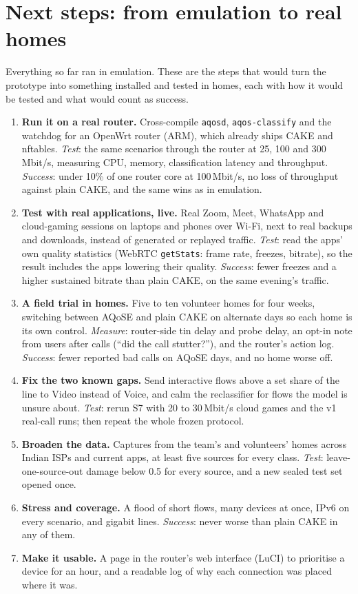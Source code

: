 \documentclass[11pt,a4paper]{article}
\begin{document}
\section{Next steps: from emulation to real homes}
Everything so far ran in emulation. These are the steps that would turn the prototype into something installed and tested in homes, each with how it would be tested and what would count as success.

\begin{enumerate}[leftmargin=*,itemsep=6pt]
\item \textbf{Run it on a real router.} Cross-compile \texttt{aqosd}, \texttt{aqos-classify} and the watchdog for an OpenWrt router (ARM), which already ships CAKE and nftables. \emph{Test}: the same scenarios through the router at 25, 100 and 300\,Mbit/s, measuring CPU, memory, classification latency and throughput. \emph{Success}: under 10\% of one router core at 100\,Mbit/s, no loss of throughput against plain CAKE, and the same wins as in emulation.
\item \textbf{Test with real applications, live.} Real Zoom, Meet, WhatsApp and cloud-gaming sessions on laptops and phones over Wi-Fi, next to real backups and downloads, instead of generated or replayed traffic. \emph{Test}: read the apps' own quality statistics (WebRTC \texttt{getStats}: frame rate, freezes, bitrate), so the result includes the apps lowering their quality. \emph{Success}: fewer freezes and a higher sustained bitrate than plain CAKE, on the same evening's traffic.
\item \textbf{A field trial in homes.} Five to ten volunteer homes for four weeks, switching between AQoSE and plain CAKE on alternate days so each home is its own control. \emph{Measure}: router-side tin delay and probe delay, an opt-in note from users after calls (``did the call stutter?''), and the router's action log. \emph{Success}: fewer reported bad calls on AQoSE days, and no home worse off.
\item \textbf{Fix the two known gaps.} Send interactive flows above a set share of the line to Video instead of Voice, and calm the reclassifier for flows the model is unsure about. \emph{Test}: rerun S7 with 20 to 30\,Mbit/s cloud games and the v1 real-call runs; then repeat the whole frozen protocol.
\item \textbf{Broaden the data.} Captures from the team's and volunteers' homes across Indian ISPs and current apps, at least five sources for every class. \emph{Test}: leave-one-source-out damage below 0.5 for every source, and a new sealed test set opened once.
\item \textbf{Stress and coverage.} A flood of short flows, many devices at once, IPv6 on every scenario, and gigabit lines. \emph{Success}: never worse than plain CAKE in any of them.
\item \textbf{Make it usable.} A page in the router's web interface (LuCI) to prioritise a device for an hour, and a readable log of why each connection was placed where it was.
\end{enumerate}
\end{document}

